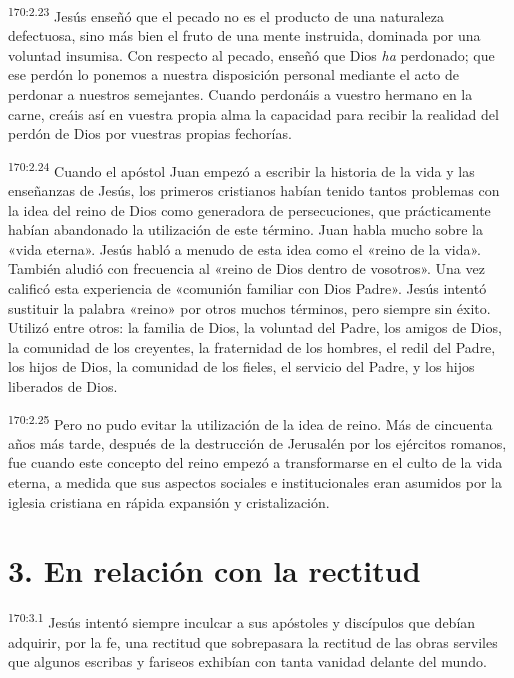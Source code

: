\par 
\textsuperscript{170:2.23} Jesús enseñó que el pecado no es el producto de una naturaleza defectuosa, sino más bien el fruto de una mente instruida, dominada por una voluntad insumisa. Con respecto al pecado, enseñó que Dios \textit{ha} perdonado; que ese perdón lo ponemos a nuestra disposición personal mediante el acto de perdonar a nuestros semejantes. Cuando perdonáis a vuestro hermano en la carne, creáis así en vuestra propia alma la capacidad para recibir la realidad del perdón de Dios por vuestras propias fechorías.

\par 
\textsuperscript{170:2.24} Cuando el apóstol Juan empezó a escribir la historia de la vida y las enseñanzas de Jesús, los primeros cristianos habían tenido tantos problemas con la idea del reino de Dios como generadora de persecuciones, que prácticamente habían abandonado la utilización de este término. Juan habla mucho sobre la «vida eterna». Jesús habló a menudo de esta idea como el «reino de la vida». También aludió con frecuencia al «reino de Dios dentro de vosotros». Una vez calificó esta experiencia de «comunión familiar con Dios Padre». Jesús intentó sustituir la palabra «reino» por otros muchos términos, pero siempre sin éxito. Utilizó entre otros: la familia de Dios, la voluntad del Padre, los amigos de Dios, la comunidad de los creyentes, la fraternidad de los hombres, el redil del Padre, los hijos de Dios, la comunidad de los fieles, el servicio del Padre, y los hijos liberados de Dios.

\par 
\textsuperscript{170:2.25} Pero no pudo evitar la utilización de la idea de reino. Más de cincuenta años más tarde, después de la destrucción de Jerusalén por los ejércitos romanos, fue cuando este concepto del reino empezó a transformarse en el culto de la vida eterna, a medida que sus aspectos sociales e institucionales eran asumidos por la iglesia cristiana en rápida expansión y cristalización.

\section*{3. En relación con la rectitud}
\par 
\textsuperscript{170:3.1} Jesús intentó siempre inculcar a sus apóstoles y discípulos que debían adquirir, por la fe, una rectitud que sobrepasara la rectitud de las obras serviles que algunos escribas y fariseos exhibían con tanta vanidad delante del mundo.

